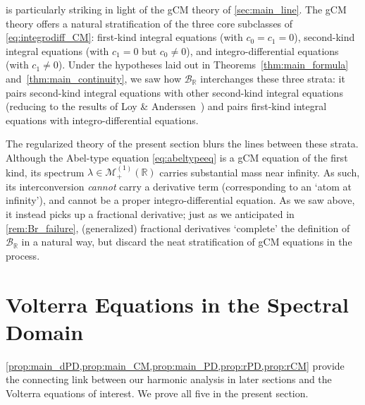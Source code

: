 \documentclass{cams-l} %
\newcommand{\dave}[1]{#1}\newcommand{\davebegin}{}\newcommand{\daveend}{}\newcommand{\george}[1]{#1}
\newcommand{\RR}{\mathbb R}
\newcommand{\cM}{\mathcal M}
\newcommand{\cB}{\mathcal B}
\theoremstyle{definition}
\theoremstyle{remark}
\numberwithin{equation}{section}
\begin{document}
 is particularly striking in light of the gCM theory of \cref{sec:main_line}. The gCM theory offers a natural stratification of the three core subclasses of \ref{eq:integrodiff_CM}: first-kind integral equations (with $c_0=c_1=0$), second-kind integral equations (with $c_1=0$ but $c_0\neq 0$), and integro-differential equations (with $c_1\neq 0$). Under the hypotheses laid out in Theorems~\ref{thm:main_formula} and~\ref{thm:main_continuity}, we saw how $\cB_\RR$ interchanges these three strata: it pairs second-kind integral equations with other second-kind integral equations (reducing to the results of Loy \& Anderssen~\cite{loy_anderssen}) and pairs first-kind integral equations with integro-differential equations.

The regularized theory of the present section blurs the lines between these strata. Although the Abel-type equation \cref{eq:abeltypeeq} is \dave{a gCM equation} of the first kind, \dave{its spectrum} $\lambda\in\cM_+^{(1)}(\RR)$ carries substantial mass near infinity. As such, its interconversion \emph{cannot} carry a derivative term (corresponding to an `atom at infinity'), and cannot be a proper integro-differential equation. As we saw above, it instead picks up a fractional derivative; just as we anticipated in \cref{rem:Br_failure}, (generalized) fractional derivatives `complete' the definition of $\cB_\RR$ in a natural way, but discard the neat stratification of gCM equations in the process.

\section{Volterra Equations in the Spectral Domain}\label{sec:laplace}
\cref{prop:main_dPD,prop:main_CM,prop:main_PD,prop:rPD,prop:rCM} provide the connecting link between our harmonic analysis in later sections and the Volterra equations of interest. We prove all five in the present section.
\end{document}
